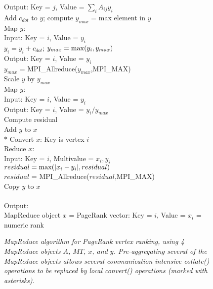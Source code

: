 \begin{figure}[htb]
\begin{center}
{\begin{minipage}{\textwidth}
\begin{tabbing}
\> \> \> Output: Key = $j$, Value = $\sum_i A_{ij} y_i$ \\
 Add $c_{dot}$ to $y$; compute $y_{max}$ = max element in $y$ \\
\> \> Map $y$:  \\
\> \> \> Input: Key = $i$, Value = $y_i$ \\
\> \> \> $y_i = y_i + c_{dot}$; $y_{max} = {\rm max}(y_i,y_{max})$ \\
\> \> \> Output:  Key = $i$, Value = $y_i$ \\
\> \> $y_{max}$ = MPI\_Allreduce($y_{max}$,MPI\_MAX) \\
 Scale $y$ by $y_{max}$ \\
\> \> Map $y$: \\
\> \> \> Input:  Key = $i$, Value = $y_i$ \\
\> \> \> Output:  Key = $i$, Value = $y_i / y_{max}$ \\
 Compute residual \\
\> \> Add $y$ to $x$ \\
$*$\> \> Convert $x$:  Key is vertex $i$ \\
\> \> Reduce $x$:  \\
\> \> \> Input: Key = $i$, Multivalue = $x_i, y_i$ \\
\> \> \> $residual = {\rm max}(|x_i - y_i|,residual)$ \\
\> \> $residual$ = MPI\_Allreduce($residual$,MPI\_MAX) \\
 Copy $y$ to $x$ \\
\\
Output: \\
\> MapReduce object $x$ = PageRank vector: Key = $i$, Value = $x_i$ = numeric rank \\

  \end{tabbing}
 \end{minipage}}\end{center}

 \caption{\it MapReduce algorithm for PageRank vertex ranking, using 4
 MapReduce objects $A$, $MT$, $x$, and $y$.  Pre-aggregating several
 of the MapReduce objects allows several communication intensive {\it
 collate()} operations to be replaced by local {\it convert()}
 operations (marked with asterisks).}

 \label{fig:pr2}
\end{figure}

